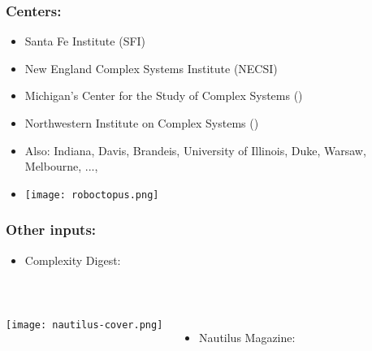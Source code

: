 \begin{frame}
  \frametitle{Centers:}

  \begin{block}{}
  \begin{itemize}
  \item 
    Santa Fe Institute (SFI)
  \item 
    New England Complex Systems Institute (NECSI)
  \item 
    Michigan's Center for the Study of Complex Systems 
    () 
  \item 
    Northwestern Institute on Complex Systems 
    ()
  \item 
    Also: Indiana, Davis, Brandeis, University of Illinois, Duke, Warsaw, Melbourne, ..., 
  \item
    \texttt{[image: roboctopus.png]}
  \end{itemize}
  \end{block}

\end{frame}


\begin{frame}
  \frametitle{Other inputs:}

  \begin{block}{}
    \begin{itemize}
    \item
      Complexity Digest:
      
      {\small
        \\
      }
    \end{itemize}
    \begin{columns}
      \texttt{[image: nautilus-cover.png]}
      \begin{itemize}
      \item 
        Nautilus Magazine: 
      \end{itemize}
    \end{columns}
  \end{block}

\end{frame}



